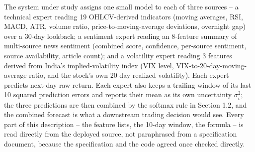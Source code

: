 \documentclass[10pt,a4paper,twocolumn]{article}
\begin{document}
The system under study assigns one small model to each of three sources -- a technical expert reading 19 OHLCV-derived indicators (moving averages, RSI, MACD, ATR, volume ratio, price-to-moving-average deviations, overnight gap) over a 30-day lookback; a sentiment expert reading an 8-feature summary of multi-source news sentiment (combined score, confidence, per-source sentiment, source availability, article count); and a volatility expert reading 3 features derived from India's implied-volatility index (VIX level, VIX-to-20-day-moving-average ratio, and the stock's own 20-day realized volatility). Each expert predicts next-day raw return. Each expert also keeps a trailing window of its last 10 squared prediction errors and reports their mean as its own uncertainty $\sigma_i^2$; the three predictions are then combined by the softmax rule in Section 1.2, and the combined forecast is what a downstream trading decision would see. Every part of this description -- the feature lists, the 10-day window, the formula -- is read directly from the deployed source, not paraphrased from a specification document, because the specification and the code agreed once checked directly.
\end{document}
